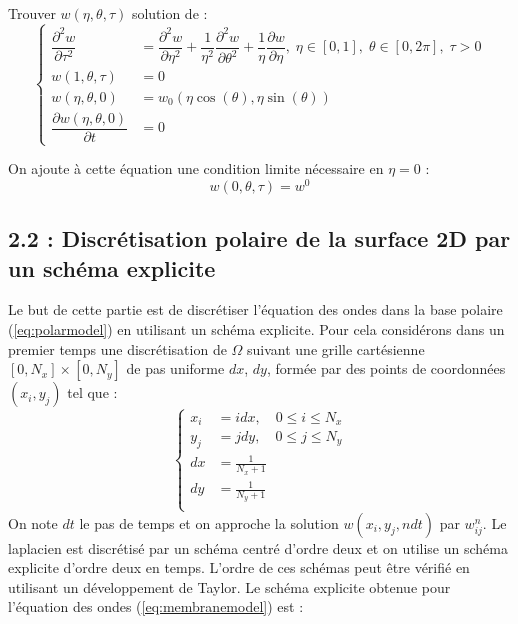 \documentclass[a4,12pt]{article}
\begin{document}
		      ~\\\\\\\\

		      Trouver $w(\eta,\theta,\tau)$ solution de :
		      \begin{equation}
			\left\{
			  \begin{array}{rl}
			    \dfrac{\partial^2 w}{\partial \tau^2} & =   \dfrac{\partial^2 w}{\partial \eta^2}+\dfrac{1}
			    {\eta^2}\dfrac{\partial^2 w}{\partial \theta^2}+\dfrac{1}{\eta}\dfrac{\partial w}{\partial \eta},\;\eta\in[0,1],\;		\theta\in[0,2\pi],\;\tau>0\\
			    w(1,\theta,\tau)& = 0  \\
			    w(\eta,\theta,0)& = w_0(\eta \cos(\theta),\eta \sin (\theta)) \\
			    \dfrac{\partial w(\eta,\theta,0)}{\partial t} & = 0
			  \end{array}
			  \right.
			  \label{eq:polarmodel}
			\end{equation}

			On ajoute à cette équation une condition limite nécessaire  en $\eta=0$ :
			\[
			  w(0,\theta,\tau)=w^0
			\]


			\subsection*{2.2 : Discrétisation polaire de la surface 2D par un schéma explicite }
			Le but de cette partie est de discrétiser l'équation des ondes dans la base polaire (\ref{eq:polarmodel}) en utilisant un schéma explicite. Pour cela considérons dans un premier temps une discrétisation de $\Omega $ suivant une grille cartésienne $[0,N_x]\times [0,N_y]$ de pas uniforme $dx$, $dy$, formée par des points de coordonnées $(x_i,y_j)$ tel que :
			\begin{equation*}{}
			  \left\{
			    \begin{array}{rl}
			      x_i &=i dx,\quad 0\leq i \leq N_x \\
			      y_j &=j dy,\quad  0\leq j \leq N_y \\
			      dx & =\frac{1}{N_x+1}\\
			      dy &=\frac{1}{N_y+1}\\
			    \end{array}
			    \right.
			  \end{equation*}
			  On note $dt$ le pas de temps et on approche la solution $w(x_i,y_j,ndt)$ par $w_{ij}^{n}$. Le laplacien est discrétisé  par un schéma centré d'ordre deux  et on utilise un schéma explicite d'ordre deux en temps. L'ordre de ces schémas peut être vérifié en utilisant un développement de Taylor. Le schéma explicite obtenue pour l'équation des ondes (\ref{eq:membranemodel}) est :
\end{document}
